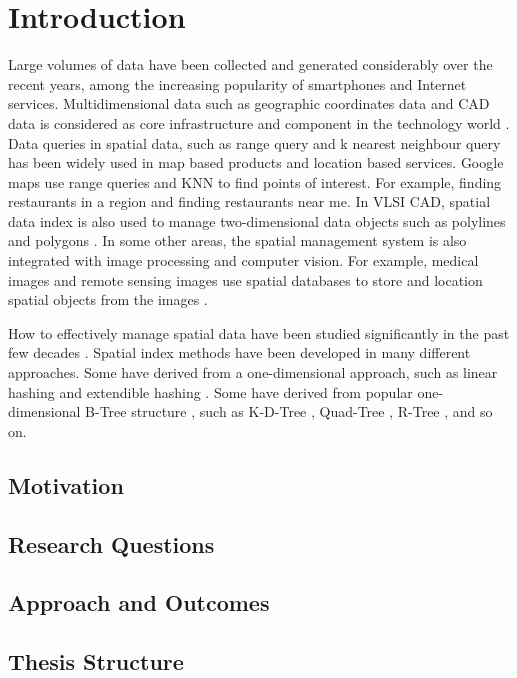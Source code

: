 \chapter{Introduction}

Large volumes of data have been collected and generated considerably over the recent years, among the increasing popularity of smartphones and Internet services. Multidimensional data such as geographic coordinates data and CAD data is considered as core infrastructure and component in the technology world \cite{gunther1990research, morton1966computer}. Data queries in spatial data, such as range query and k nearest neighbour query has been widely used in map based products and location based services. Google maps use range queries and KNN to find points of interest. For example, finding restaurants in a region and finding restaurants near me. In VLSI CAD, spatial data index is also used to manage two-dimensional data objects such as polylines and polygons \cite{liu1994evaluation}. In some other areas, the spatial management system is also integrated with image processing and computer vision. For example, medical images and remote sensing images use spatial databases to store and location spatial objects from the images \cite{borah2004improved, adhikary1996knowledge, mantel2004matching, tagare1997medical}. 

How to effectively manage spatial data have been studied significantly in the past few decades \cite{Gaede:1998fp, ooi1990efficient}. Spatial index methods have been developed in many different approaches. Some have derived from a one-dimensional approach, such as linear hashing \cite{larson1980linear} and extendible hashing \cite{fagin1979extendible}. Some have derived from popular one-dimensional B-Tree structure \cite{Bayer:2002ds}, such as K-D-Tree \cite{Bentley:1975gn}, Quad-Tree \cite{CSUR:tm}, R-Tree \cite{Guttman:1984ka}, and so on. 


\section{Motivation}

\section{Research Questions}

\section{Approach and Outcomes}

\section{Thesis Structure}
